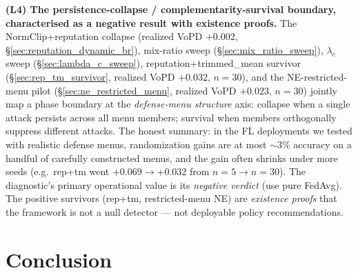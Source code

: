 \documentclass{article}
\begin{document}
\textbf{(L4) The persistence-collapse / complementarity-survival boundary, characterised as a negative result with existence proofs.} The NormClip+reputation collapse (realized VoPD $+0.002$, §\ref{sec:reputation_dynamic_br}), mix-ratio sweep (§\ref{sec:mix_ratio_sweep}), $\lambda_c$ sweep (§\ref{sec:lambda_c_sweep}), reputation+trimmed\_mean survivor (§\ref{sec:rep_tm_survivor}, realized VoPD $+0.032$, $n=30$), and the NE-restricted-menu pilot (§\ref{sec:ne_restricted_menu}, realized VoPD $+0.023$, $n=30$) jointly map a phase boundary at the \emph{defense-menu structure} axis: collapse when a single attack persists across all menu members; survival when members orthogonally suppress different attacks. The honest summary: in the FL deployments we tested with realistic defense menus, randomization gains are at most $\sim 3\%$ accuracy on a handful of carefully constructed menus, and the gain often shrinks under more seeds (e.g.\ rep+tm went $+0.069 \to +0.032$ from $n=5 \to n=30$). The diagnostic's primary operational value is its \emph{negative verdict} (use pure FedAvg). The positive survivors (rep+tm, restricted-menu NE) are \emph{existence proofs} that the framework is not a null detector --- not deployable policy recommendations.

\section{Conclusion}
\label{sec:conclusion}
\end{document}
